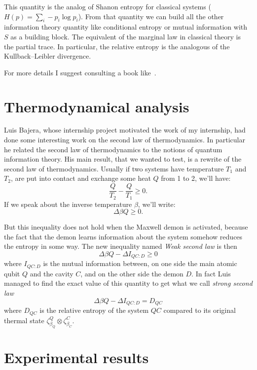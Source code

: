 \documentclass[10pt,a4paper]{report}
\theoremstyle{plain}
\theoremstyle{definition}
\theoremstyle{remark}
\renewcommand{\geq}{\geqslant}
\begin{document}
This quantity is the analog of Shanon entropy for classical systems ($H(p) =
\sum_i -p_i \log p_i$). From that quantity we can build all the other
information theory quantity like conditional entropy or mutual information with
$S$ as a building block. The equivalent of the marginal law in classical theory
is the partial trace. In particular, the relative entropy is the analogous of
the Kullback–Leibler divergence.

For more details I suggest consulting a book like~\cite{QCQI}.

\section{Thermodynamical analysis}

Luis Bajera, whose internship project motivated the work of my internship, had done
some interesting work on the second law of thermodynamics. In particular he
related the second law of thermodynamics to the notions of quantum information
theory. His main result, that we
wanted to test, is a rewrite of the second law of thermodynamics. Usually if two
systems have temperature $T_1$ and $T_2$, are put into contact and exchange some
heat $Q$ from 1 to 2, we'll have:
\[\frac Q{T_2} - \frac Q{T_1} \geq 0.\]
If we speak about the inverse temperature $\beta$, we'll write:
\[\Delta\beta Q \geq 0.\]

But this inequality does not hold when the Maxwell demon is activated, because
the fact that the demon learns information about the system somehow reduces the
entropy in some way. The new inequality named \emph{Weak second law} is then
\begin{equation}\label{eqn:weaksnd}
\Delta\beta Q - \Delta I_{QC:D} \geq 0
\end{equation}
where $I_{QC:D}$ is the mutual information between, on one side the main atomic
qubit $Q$
and the cavity $C$, and on the other side the demon $D$. In fact
Luis managed to find the exact value of this quantity to get what we call
\emph{strong second law}
\begin{equation}\label{eqn:strgsnd}
  \Delta\beta Q - \Delta I_{QC:D} = D_{QC}
\end{equation}
where $D_{QC}$ is the relative entropy of the system $QC$ compared to its
original thermal state $\zeta^Q_{\beta_Q} \otimes \zeta^C_{\beta_C}$.

\section{Experimental results}\label{sec:res1}
\end{document}
